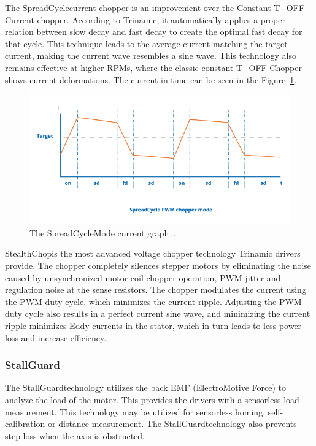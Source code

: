 The SpreadCycle\texttrademark current chopper is an improvement over the Constant T\_OFF Current chopper.
According to Trinamic, it automatically applies a proper relation between slow decay and fast decay to create the optimal fast decay for that cycle\cite{trinamic_chopper_nodate}.
This technique leads to the average current matching the target current, making the current wave resembles a sine wave.
This technology also remains effective at higher RPMs, where the classic constant T\_OFF Chopper shows current deformations\cite{trinamic_chopper_nodate}.
The current in time can be seen in the Figure~\ref{fig:spread_cycle}.

\begin{figure}[H]
    \centering
    \includegraphics[width=\textwidth]{obrazky/spread_cycle}
    \caption{The SpreadCycle\texttrademark Mode current graph~\cite{trinamic_chopper_nodate}.}
    \label{fig:spread_cycle}
\end{figure}

StealthChop\texttrademark is the most advanced voltage chopper technology Trinamic drivers provide.
The chopper completely silences stepper motors by eliminating the noise caused by unsynchronized motor coil chopper operation, PWM jitter and regulation noise at the sense resistors\cite{trinamic_chopper_nodate}.
The chopper modulates the current using the PWM duty cycle, which minimizes the current ripple\cite{trinamic_chopper_nodate}.
Adjusting the PWM duty cycle also results in a perfect current sine wave, and minimizing the current ripple minimizes Eddy currents in the stator, which in turn leads to less power loss and increase efficiency\cite{trinamic_chopper_nodate}.


\subsubsection{StallGuard\texttrademark}
The StallGuard\texttrademark technology utilizes the back EMF (ElectroMotive Force) to analyze the load of the motor.
This provides the drivers with a sensorless load measurement.
This technology may be utilized for sensorless homing, self-calibration or distance measurement.
The StallGuard\texttrademark technology also prevents step loss when the axis is obstructed\cite{trinamic_trinamic_nodate}.

